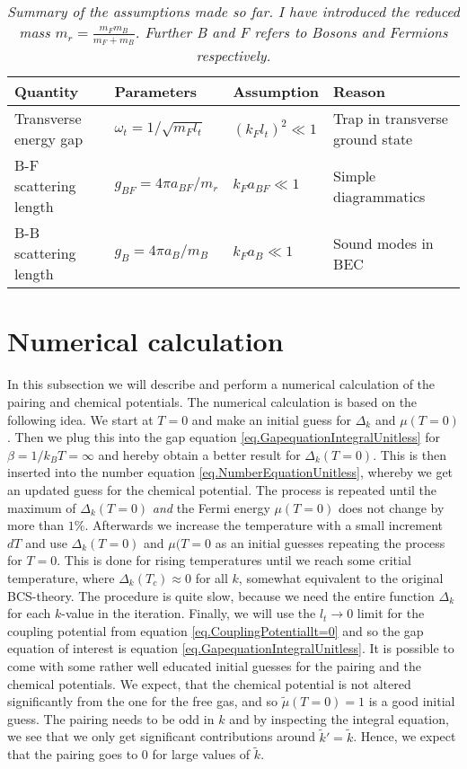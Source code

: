 \begin{table}[htb]
\centering
\caption{\textit{Summary of the assumptions made so far. I have introduced the reduced mass $m_r = \frac{m_Fm_B}{m_F+m_B}$. Further B and F refers to Bosons and Fermions respectively.}}
\begin{tabular}{|l|l|l|l|}
\hline \textbf{Quantity} & \textbf{Parameters} & \textbf{Assumption}			& \textbf{Reason}	\\
\hline Transverse energy gap & $\omega_t = 1/\sqrt{m_Fl_t}$ & $(k_Fl_t)^2\ll 1$ & Trap in transverse ground state \\
\hline B-F scattering length& $g_{BF} = 4\pi a_{BF}/m_r$ 	& $k_Fa_{BF} \ll 1$	& Simple diagrammatics\\
\hline B-B scattering length  & $g_B = 4\pi a_B/m_B$		& $k_Fa_B 	 \ll 1$	& Sound modes in BEC  \\
\hline 
\end{tabular}
\label{tab.assumptions}
\end{table}

\section{Numerical calculation} \label{sec.pairingandchemicalpotential.numericalcalculation}
In this subsection we will describe and perform a numerical calculation of the pairing and chemical potentials. The numerical calculation is based on the following idea. We start at $T=0$ and make an initial guess for $\Delta_k$ and $\mu(T=0)$. Then we plug this into the gap equation \eqref{eq.GapequationIntegralUnitless} for $\beta = 1/k_BT = \infty$ and hereby obtain a better result for $\Delta_k(T=0)$. This is then inserted into the number equation \eqref{eq.NumberEquationUnitless}, whereby we get an updated guess for the chemical potential. The process is repeated until the maximum of $\Delta_k(T=0)$ \textit{and} the Fermi energy $\mu(T=0)$ does not change by more than $1\%$. Afterwards we increase the temperature with a small increment $dT$ and use $\Delta_k(T=0)$ and $\mu(T=0$ as an initial guesses repeating the process for $T=0$. This is done for rising temperatures until we reach some critial temperature, where $\Delta_k(T_c)\approx 0$ for all $k$, somewhat equivalent to the original BCS-theory\cite{Tinkham,LandauStatPhys2,PlischkeStatPhys}. The procedure is quite slow, because we need the entire function $\Delta_k$ for each $k$-value in the iteration. Finally, we will use the $l_t \to 0$ limit for the coupling potential from equation \eqref{eq.CouplingPotentiallt=0} and so the gap equation of interest is equation \eqref{eq.GapequationIntegralUnitless}. It is possible to come with some rather well educated initial guesses for the pairing and the chemical potentials. We expect, that the chemical potential is not altered significantly from the one for the free gas, and so $\tilde{\mu}(T = 0) = 1$ is a good initial guess. The pairing needs to be odd in $k$ and by inspecting the integral equation, we see that we only get significant contributions around $\tilde{k}' = \tilde{k}$. Hence, we expect that the pairing goes to 0 for large values of $\tilde{k}$.  

